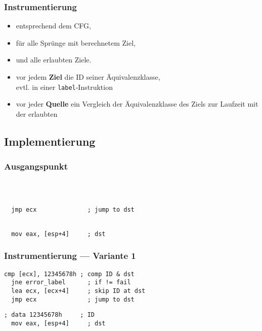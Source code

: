 \documentclass[serif,slidestop,compress,red]{beamer}
\begin{document}
\begin{frame}
  \frametitle{Instrumentierung}
  \begin{itemize}
    \item entsprechend dem CFG,
    \item für alle Sprünge mit berechnetem Ziel,
    \item und alle erlaubten Ziele.
  \end{itemize}
  \begin{itemize}
    \item vor jedem \textbf{Ziel} die ID seiner Äquivalenzklasse,\\ evtl. in einer
    \texttt{label}-Instruktion
    \item vor jeder \textbf{Quelle} ein Vergleich der Äquivalenzklasse des
    Ziels zur Laufzeit mit der erlaubten
  \end{itemize}
\end{frame}

\subsection{Implementierung}

\begin{frame}[fragile]
  \frametitle{Ausgangspunkt}
  \begin{lstlisting}[title=Quelle]



  jmp ecx              ; jump to dst
  \end{lstlisting}
  \begin{lstlisting}[title=Ziel]

  mov eax, [esp+4]     ; dst
  \end{lstlisting}
\end{frame}

\begin{frame}[fragile]
  \frametitle{Instrumentierung — Variante 1}
  \begin{lstlisting}[title=Quelle]
  cmp [ecx], 12345678h ; comp ID & dst
  jne error_label      ; if != fail
  lea ecx, [ecx+4]     ; skip ID at dst
  jmp ecx              ; jump to dst
  \end{lstlisting}
  \begin{lstlisting}[title=Ziel]
  ; data 12345678h     ; ID
  mov eax, [esp+4]     ; dst
  \end{lstlisting}
\end{frame}

\end{document}
